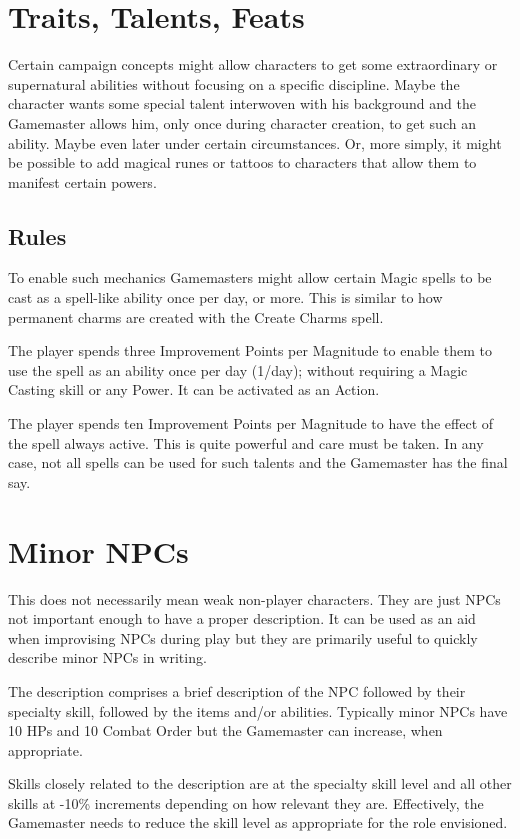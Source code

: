 \section{Traits, Talents, Feats}

Certain campaign concepts might allow characters to get some extraordinary or supernatural abilities without focusing on a specific discipline. Maybe the character wants some special talent interwoven with his background and the Gamemaster allows him, only once during character creation, to get such an ability. Maybe even later under certain circumstances. Or, more simply, it might be possible to add magical runes or tattoos to characters that allow them to manifest certain powers.

\subsection{Rules}
To enable such mechanics Gamemasters might allow certain Magic spells to be cast as a spell-like ability once per day, or more. This is similar to how permanent charms are created with the Create Charms spell.

The player spends three Improvement Points per Magnitude to enable them to use the spell as an ability once per day (1/day); without requiring a Magic Casting skill or any Power. It can be activated as an Action. 

The player spends ten Improvement Points per Magnitude to have the effect of the spell always active. This is quite powerful and care must be taken. In any case, not all spells can be used for such talents and the Gamemaster has the final say.


\section{Minor NPCs}
This does not necessarily mean weak non-player characters. They are just NPCs not important enough to have a proper description. It can be used as an aid when improvising NPCs during play but they are primarily useful to quickly describe minor NPCs in writing.

The description comprises a brief description of the NPC followed by their specialty skill, followed by the items and/or abilities. Typically minor NPCs have 10 HPs and 10 Combat Order but the Gamemaster can increase, when appropriate.

Skills closely related to the description are at the specialty skill level and all other skills at -10\% increments depending on how relevant they are. Effectively, the Gamemaster needs to reduce the skill level as appropriate for the role envisioned.



